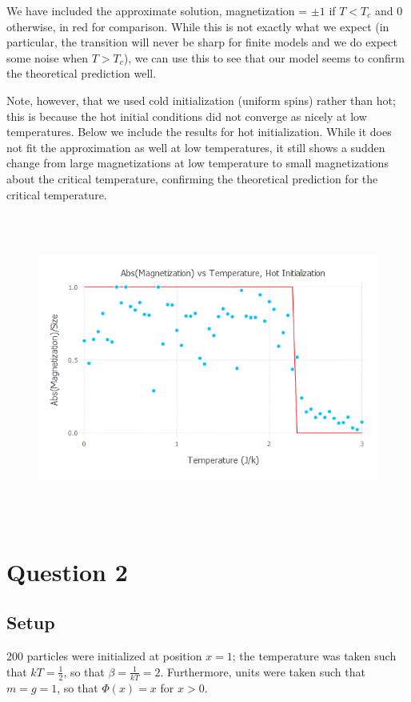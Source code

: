 \documentclass{article}
\begin{document}
We have included the approximate solution, magnetization = $\pm1$ if $T<T_c$ and $0$ otherwise, in red for comparison. While this is not exactly what we expect (in particular, the transition will never be sharp for finite models and we do expect some noise when $T>T_c$), we can use this to see that our model seems to confirm the theoretical prediction well.

Note, however, that we used cold initialization (uniform spins) rather than hot; this is because the hot initial conditions did not converge as nicely at low temperatures. Below we include the results for hot initialization. While it does not fit the approximation as well at low temperatures, it still shows a sudden change from large magnetizations at low temperature to small magnetizations about the critical temperature, confirming the theoretical prediction for the critical temperature.

\begin{figure}[H]
	\includegraphics[width=6in,height=4in]{"tempvsmag_hot"}
\end{figure}

\section{Question 2}
\subsection{Setup}
200 particles were initialized at position $x=1$; the temperature was taken such that $kT=\frac{1}{2}$, so that $\beta = \frac{1}{kT} = 2$. Furthermore, units were taken such that $m=g=1$, so that $\Phi(x) = x$ for $x>0$.
\end{document}
